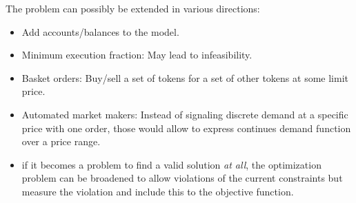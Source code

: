 \documentclass[11pt,parskip=full]{scrartcl}%
\newcommand*{\Min}{\mathrm{min}}
\begin{document}
The problem can possibly be extended in various directions:
\begin{itemize}
  \item Add accounts/balances to the model.
  \item Minimum execution fraction: May lead to infeasibility.
  \item Basket orders: Buy/sell a set of tokens for a set of other tokens at some limit price.
  \item Automated market makers: Instead of signaling discrete demand at a specific price with one
  order, those would allow to express continues demand function over a price range.
  \item if it becomes a problem to find a valid solution \emph{at all}, the optimization problem can
  be broadened to allow violations of the current constraints but measure the violation and
  include this to the objective function.
\end{itemize}







\newpage


\end{document}
